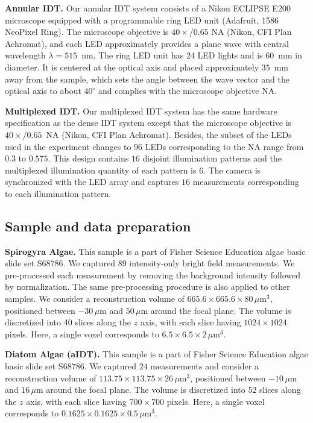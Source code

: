 \documentclass[11pt]{article}
\theoremstyle{plain} %
\begin{document}
\vspace{0.5em}
\noindent\textbf{Annular IDT.} Our annular IDT system consists of a Nikon ECLIPSE E200 microscope equipped with a programmable ring LED unit (Adafruit, 1586 NeoPixel Ring). The microscope objective is $40\times$/$0.65$ NA (Nikon, CFI Plan Achromat), and each LED approximately provides a plane wave with central wavelength $\lambda=515$~nm.
The ring LED unit has 24 LED lights and is $60$~mm in diameter. It is centered at the optical axis and placed approximately $35$~mm away from the sample, which sets the angle between the wave vector and the optical axis to about $40^\circ$ and complies with the microscope objective NA\@. 

\vspace{0.5em}
\noindent\textbf{Multiplexed IDT.} Our multiplexed IDT system has the same hardware specification as the dense IDT system except that the microscope objective is $40\times$/$0.65$~NA (Nikon, CFI Plan Achromat).
Besides, the subset of the LEDs used in the experiment changes to $96$ LEDs corresponding to the NA range from $0.3$ to $0.575$.
This design contains $16$ disjoint illumination patterns and the multiplexed illumination quantity of each pattern is $6$.
The camera is synchronized with the LED array and captures $16$ measurements corresponding to each illumination pattern.

\subsection*{Sample and data preparation}
\noindent
\textbf{Spirogyra Algae.} This sample is a part of Fisher Science Education algae basic slide set S68786. We captured $89$ intensity-only bright field measurements. 
We pre-processed each measurement by removing the background intensity followed by normalization. 
The same pre-processing procedure is also applied to other samples.
We consider a reconstruction volume of $665.6 \times 665.6 \times 80\,\mu \text{m}^3$, positioned between $-30\,\mu$m and $50\,\mu$m around the focal plane. The volume is discretized into 40 slices along the $z$ axis, with each slice having $1024 \times 1024$ pixels. Here, a single voxel corresponds to $6.5 \times 6.5 \times 2 \,\mu$m$^3$. 

\vspace{0.5em}
\noindent\textbf{Diatom Algae (aIDT).}
This sample is a part of Fisher Science Education algae basic slide set S68786.
We captured $24$ measurements and consider a reconstruction volume of $113.75 \times 113.75 \times 26\,\mu$m$^3$, positioned between $-10\,\mu$m and $16\,\mu$m around the focal plane. The volume is discretized into 52 slices along the $z$ axis, with each slice having $700 \times 700$ pixels. Here, a single voxel corresponds to $0.1625 \times 0.1625 \times 0.5\,\mu$m$^3$.
\end{document}
